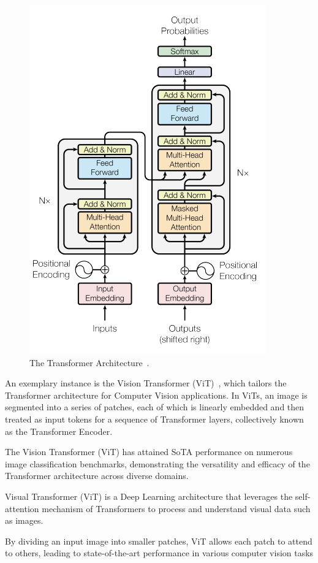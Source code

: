 \documentclass[12pt,a4paper]{report}
\begin{document}
\begin{figure}[th]
  \centering
  \includegraphics[scale=0.85]{./pics/transformer.png}
  \caption[The Transformer Architecture]{The Transformer Architecture~\cite{vaswani2017attention}.}
  \label{fig:pi7}
\end{figure}

An exemplary instance is the Vision Transformer (ViT)~\cite{dosovitskiy2020}, which tailors the Transformer architecture for Computer Vision applications. In ViTs, an image is segmented into a series of patches, each of which is linearly embedded and then treated as input tokens for a sequence of Transformer layers, collectively known as the Transformer Encoder.

The Vision Transformer (ViT) has attained SoTA performance on numerous image classification benchmarks, demonstrating the versatility and efficacy of the Transformer architecture across diverse domains.

Visual Transformer (ViT) is a Deep Learning architecture that leverages the self-attention mechanism of Transformers to process and understand visual data such as images.

By dividing an input image into smaller patches, ViT allows each patch to attend to others, leading to state-of-the-art performance in various computer vision tasks
\end{document}
